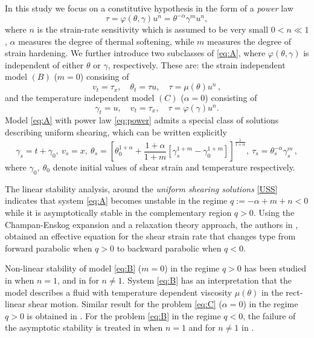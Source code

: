 \documentclass[graybox]{svmult}
\begin{document}
In this study we focus on a constitutive hypothesis in the form of a \emph{power} law 
\begin{equation}
 \tau = \varphi(\theta,\gamma)u^n = \theta^{-\alpha}\gamma^m u^n, \label{eq:power} 
\end{equation}
where $n$ is the strain-rate sensitivity which is assumed to be very small $0<n\ll1$, $\alpha$ measures the degree of thermal softening, while $m$ measures the degree of strain hardening. We further introduce two subclasses of \eqref{eq:A}, where $\varphi (\theta, \gamma)$ is independent 
of either $\theta$ or $\gamma$, respectively. These are: the strain independent model $(B)$ ($m = 0$)  consising of 
\begin{equation} \label{eq:B}\tag{B}
 v_t = \tau_x, \quad \theta_t = \tau u, \quad \tau = \mu(\theta)u^n 	\, , 	
\end{equation}
and the temperature independent model $(C)$ ($\alpha = 0$) consisting of
\begin{equation} \label{eq:C}\tag{C}
 \gamma_t = u, \quad  v_t = \tau_x, \quad \tau = \varphi(\gamma)u^n.			
\end{equation}
Model \eqref{eq:A} with power law \eqref{eq:power} admits a special class of solutions describing uniform shearing,  which can be written explicitly 
\begin{equation}
\label{USS}
 \gamma_s = t+\gamma_0, \ v_s=x, \ \theta_s=\left[\theta_0^{1+\alpha}+\frac{1+\alpha}{1+m}\left[ \gamma_s^{1+m} - \gamma_0^{1+m}\right] \right]^{\frac1{1+\alpha}}, \  \tau_s = \theta_s^{-\alpha}\gamma_s^m \, ,
\end{equation}
where $\gamma_0, \ \theta_0$ denote  initial values of shear strain and temperature respectively. 

The linear stability analysis, \cite{FM87} around the \emph{uniform shearing solutions} \eqref{USS} indicates that system \eqref{eq:A} becomes unstable in the regime 
$q:=-\alpha + m + n < 0$ while it is asymptotically stable in the complementary region $q > 0$. Using the Champan-Enskog expansion and a relaxation theory approach, the authors in \cite{KT09}, obtained an effective equation for the shear strain rate that changes type from forward parabolic when $q>0$ to backward parabolic when $q<0$. 

Non-linear stability of model \eqref{eq:B} ($m=0$) in the regime $q>0$ has been studied in \cite{dafermos_adiabatic_1983} when $n=1$, and in \cite{Tz_1986} for $n\ne1$. System \eqref{eq:B} has an interpretation that the model describes a fluid with temperature dependent viscosity $\mu(\theta)$ in the rect-linear shear motion. Similar result for the problem \eqref{eq:C} ($\alpha=0$) in the regime $q>0$  is obtained in \cite{tzavaras_nonlinear_1992}. For the problem \eqref{eq:B} in the regime $q<0$, the failure of the asymptotic stability is treated in \cite{bertsch_effect_1991} when $n=1$ and for $n\ne1$ in \cite{KT09}.  
\end{document}
